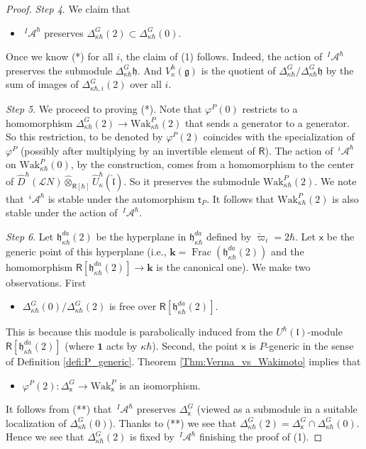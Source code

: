 \documentclass{amsart}
\theoremstyle{definition}
\newcommand{\on}{\mathrm}
\newcommand{\Ring}{\mathsf{R}}
\newcommand{\g}{\mathfrak{g}}
\newcommand{\h}{\mathfrak{h}}
\newcommand{\Wak}{\on{Wak}}
\newcommand{\lf}{\mathfrak{l}}
\newcommand{\A}{\mathscr{A}}
\newcommand{\Loop}{\mathscr{L}}
\newcommand{\bk}{\mathbf{k}}
\newcommand{\sx}{\mathsf{x}}
\numberwithin{equation}{section}
\begin{document}
\begin{proof}
{\it Step 4}. We claim that 
\begin{itemize}
\item[(*)] $\,^I\!\A^\hbar$ preserves $\Delta^G_{\kappa\hbar}(2)\subset \Delta^G_{\kappa\hbar}(0)$. 
\end{itemize}
Once we know (*) for all $i$, the claim of (1) follows. Indeed, the action of $\,^I\A^\hbar$ preserves the submodule $\Delta^G_{\kappa\hbar}\h$. And $V_{\kappa}^\hbar(\g)$ is the quotient of $\Delta^G_{\kappa\hbar}/ \Delta^G_{\kappa\hbar}\h$ by the sum of images of $\Delta^G_{\kappa\hbar,i}(2)$ over all $i$.

{\it Step 5}. We proceed to proving (*).
Note that $\varphi^P(0)$ restricts to a homomorphism 
$\Delta^G_{\kappa\hbar}(2)\rightarrow \Wak^P_{\kappa\hbar}(2)$ that sends a generator to a generator. So this restriction, to be denoted by $\varphi^P(2)$ coincides with the specialization of $\varphi^P$ (possibly after multiplying by an invertible element of $\Ring$). The action of $\,^i\A^\hbar$ on $\Wak^P_{\kappa\hbar}(0)$, by the construction, comes from a homomorphism to the center of $\widehat{D}^\hbar(\Loop N)\widehat{\otimes}_{\Ring[\hbar]}\widehat{U}^\hbar_\kappa(\hat{\lf})$.
So it preserves the submodule $\Wak^P_{\kappa\hbar}(2)$. We note that $\,^i\!\A^\hbar$ is stable under the automorphism $\mathsf{t}_P$. It follows that  $\Wak^P_{\kappa\hbar}(2)$ is also stable under the action of $\,^I\!\A^\hbar$. 

{\it Step 6}. Let $\h^{da}_{\kappa\hbar}(2)$ be the hyperplane 
in $\h^{da}_{\kappa\hbar}$ defined by $\check{\varpi}_i=2\hbar$. 
Let $\sx$ be the generic point of this hyperplane (i.e., 
$\bk=\operatorname{Frac}(\h^{da}_{\kappa\hbar}(2))$ and the homomorphism $\Ring[\h^{da}_{\kappa\hbar}(2)]\rightarrow 
\bk$ is the canonical one). We make two observations. 
First 
\begin{itemize}
\item[(**)]
$\Delta^G_{\kappa\hbar}(0)/\Delta^G_{\kappa\hbar}(2)$ is free over $\Ring[\h^{da}_{\kappa\hbar}(2)]$. 
\end{itemize}
This is because this module is parabolically induced from the $U^\hbar(\lf)$-module $\Ring[\h^{da}_{\kappa\hbar}(2)]$ (where $\mathbf{1}$ acts by 
$\kappa\hbar$). Second, the point $\sx$ is $P$-generic in the sense of 
Definition \ref{defi:P_generic}.  Theorem \ref{Thm:Verma_vs_Wakimoto} implies that 
\begin{itemize}
\item $\varphi^P(2):\Delta^G_{\sx}\rightarrow 
\Wak^P_{\sx}$ is an isomorphism. 
\end{itemize}
It follows from (**) that $\,^I\!\A^\hbar$ preserves $\Delta^G_{\sx}$ (viewed as a submodule in a suitable localization of $\Delta^G_{\kappa\hbar}(0)$). Thanks to (**) we see that $\Delta^{G}_{\kappa\hbar}(2)=\Delta^G_{\sx}\cap 
\Delta^{G}_{\kappa\hbar}(0)$. Hence we see that $\Delta^{G}_{\kappa\hbar}(2)$
is fixed by $\,^I\!\A^\hbar$ finishing the proof of (1).


\end{proof}
\end{document}
